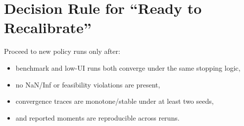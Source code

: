 \documentclass[11pt]{article}
\begin{document}
\section*{Decision Rule for ``Ready to Recalibrate''}
Proceed to new policy runs only after:
\begin{itemize}
\item benchmark and low-UI runs both converge under the same stopping logic,
\item no NaN/Inf or feasibility violations are present,
\item convergence traces are monotone/stable under at least two seeds,
\item and reported moments are reproducible across reruns.
\end{itemize}
\end{document}
